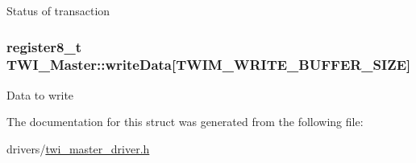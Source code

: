 Status of transaction \hypertarget{struct_t_w_i___master_ad32de221cbcd3561a486be89617dcea3}{
\subsubsection[{write\-Data}]{\setlength{\rightskip}{0pt plus 5cm}register8\-\_\-t T\-W\-I\-\_\-\-Master\-::write\-Data\mbox{[}{\bf T\-W\-I\-M\-\_\-\-W\-R\-I\-T\-E\-\_\-\-B\-U\-F\-F\-E\-R\-\_\-\-S\-I\-Z\-E}\mbox{]}}}\label{struct_t_w_i___master_ad32de221cbcd3561a486be89617dcea3}
Data to write 

The documentation for this struct was generated from the following file\-:\begin{DoxyCompactItemize}
\item 
drivers/\hyperlink{twi__master__driver_8h}{twi\-\_\-master\-\_\-driver.\-h}\end{DoxyCompactItemize}
